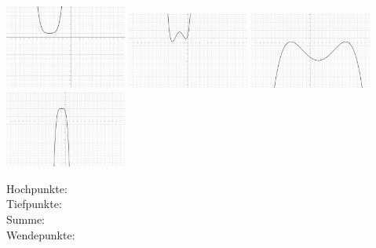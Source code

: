 \documentclass[12pt, parskip=half, a4paper, oneside]{scrartcl}
\begin{document}
\includegraphics[width=4cm]{Bilder/G45}\hfill
\includegraphics[width=4cm]{Bilder/G46}\hfill
\includegraphics[width=4cm]{Bilder/G47}\hfill
\includegraphics[width=4cm]{Bilder/G48}

\begin{addmargin}[-2cm]{0pt}
Hochpunkte: \\
Tiefpunkte: \\
Summe: \\
Wendepunkte:
\end{addmargin}
\end{document}
